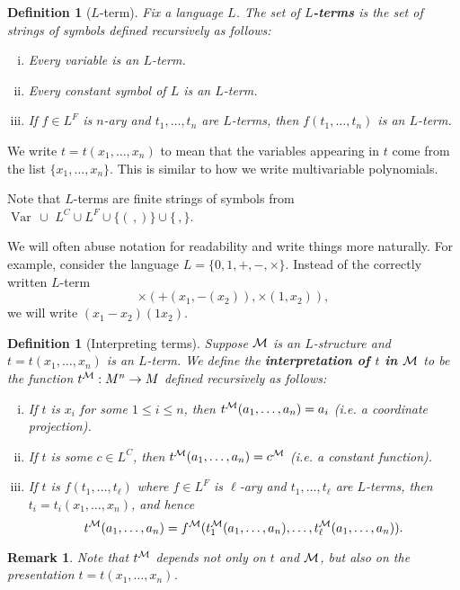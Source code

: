 \documentclass[10pt]{article}
\DeclareMathOperator{\Var}{Var}
\theoremstyle{newstyle}
\newtheorem{remark}[thm]{Remark}
\newtheorem{defn}[thm]{Definition}
\begin{document}
\begin{defn}[$L$-term]
Fix a language $L$. The set of {\bf $L$-terms} is the set of strings of symbols defined 
recursively as follows:
\begin{enumerate}[(i)]
    \item Every variable is an $L$-term.
    \item Every constant symbol of $L$ is an $L$-term.
    \item If $f \in L^F$ is $n$-ary and $t_1, \dots, t_n$ are $L$-terms, then 
    $f(t_1, \dots, t_n)$ is an $L$-term.
\end{enumerate}
\end{defn}
We write $t = t(x_1, \dots, x_n)$ to mean that the variables appearing in $t$ come 
from the list $\{x_1, \dots, x_n\}$. This is similar to how we write multivariable polynomials.

Note that $L$-terms are finite strings of symbols from $\Var \, \cup \,\, L^C \cup L^F 
\cup \{(\,, )\} \cup \{\,,\}$.

We will often abuse notation for readability and write things more naturally. 
For example, consider the language $L = \{0, 1, +, -, \times\}$. Instead of the correctly 
written $L$-term 
\[ \times (+(x_1, -(x_2)), \times(1, x_2)), \] 
we will write $(x_1 - x_2)(1x_2)$.

\begin{defn}[Interpreting terms] 
Suppose ${\cal M}$ is an $L$-structure and $t = t(x_1, \dots, x_n)$ is an $L$-term. We define 
the {\bf interpretation of $t$ in ${\cal M}$} to be the function $t^{\cal M} : M^n \to M$ 
defined recursively as follows:
\begin{enumerate}[(i)]
    \item If $t$ is $x_i$ for some $1 \leq i \leq n$, then $t^{\cal M}(a_1, \dots, a_n) = a_i$ 
    (i.e. a coordinate projection). 
    \item If $t$ is some $c \in L^C$, then $t^{\cal M}(a_1, \dots, a_n) = c^{\cal M}$ 
    (i.e. a constant function).
    \item If $t$ is $f(t_1, \dots, t_\ell)$ where $f \in L^F$ is $\ell$-ary 
    and $t_1, \dots, t_\ell$ are $L$-terms, then $t_i = t_i(x_1, \dots, x_n)$, and hence 
    \[ t^{\cal M}(a_1, \dots, a_n) = f^{\cal M}(t_1^{\cal M}(a_1, \dots, a_n), 
    \dots, t_\ell^{\cal M}(a_1, \dots, a_n)). \]
\end{enumerate}
\end{defn}

\begin{remark}
Note that $t^{\cal M}$ depends not only on $t$ and ${\cal M}$, but also on the 
presentation $t = t(x_1, \dots, x_n)$. 
\end{remark}
\end{document}
